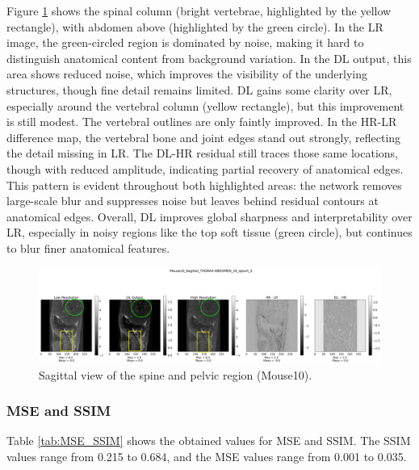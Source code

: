 \documentclass[twocolumn]{article}
\begin{document}
Figure \ref{fig:val_3} shows the spinal column (bright vertebrae, highlighted by the yellow rectangle), with abdomen  above (highlighted by the green circle). 
In the LR image, the green-circled region is dominated by noise, making it hard to distinguish anatomical content from background variation. 
In the DL output, this area shows reduced noise, which improves the visibility of the underlying structures, though fine detail remains limited. 
DL gains some clarity over LR, especially around the vertebral column (yellow rectangle), but this improvement is still modest. 
The vertebral outlines are only faintly improved. In the HR-LR difference map, the vertebral bone and joint edges stand out strongly, reflecting the detail missing in LR. 
The DL-HR residual still traces those same locations, though with reduced amplitude, indicating partial recovery of anatomical edges. 
This pattern is evident throughout both highlighted areas: the network removes large-scale blur and suppresses noise but leaves behind residual contours at anatomical edges. 
Overall, DL improves global sharpness and interpretability over LR, especially in noisy regions like the top soft tissue (green circle), but continues to blur finer anatomical features.

\begin{figure}
    \centering
    \includegraphics[width=1\linewidth]{Mouse10_Sagittal_val.png}
    \caption{Sagittal view of the spine and pelvic region (Mouse10).}
    \label{fig:val_3}
\end{figure}



\subsubsection{MSE and SSIM}
Table \ref{tab:MSE_SSIM}  shows the obtained values for MSE and SSIM. The SSIM values range from 0.215 to 0.684, and the MSE values range from 0.001 to 0.035.
\end{document}
